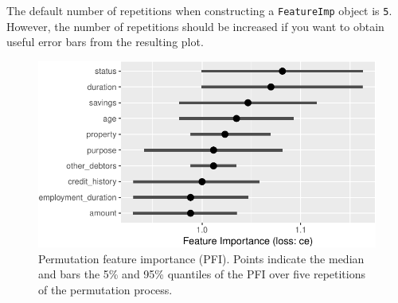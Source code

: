 \begin{tcolorbox}[enhanced jigsaw, opacitybacktitle=0.6, rightrule=.15mm, opacityback=0, arc=.35mm, breakable, titlerule=0mm, colframe=quarto-callout-tip-color-frame, coltitle=black, bottomrule=.15mm, toprule=.15mm, colback=white, colbacktitle=quarto-callout-tip-color!10!white, bottomtitle=1mm, toptitle=1mm, title=\textcolor{quarto-callout-tip-color}{\faLightbulb}\hspace{0.5em}{Increase the Number of Repetitions to Obtain Useful Error Bars}, leftrule=.75mm, left=2mm]

The default number of repetitions when constructing a
\texttt{FeatureImp} object is \texttt{5}. However, the number of
repetitions should be increased if you want to obtain useful error bars
from the resulting plot.

\end{tcolorbox}

\begin{Shaded}
\begin{Highlighting}[]
\OtherTok{=}\SpecialCharTok{$} \NormalTok{, } \NormalTok{)}
\SpecialCharTok{$}\NormalTok{()}
\end{Highlighting}
\end{Shaded}

\begin{figure}

{\centering \includegraphics[width=1\textwidth,height=\textheight]{chapters/chapter12/model_interpretation_files/figure-pdf/fig-iml-pfi-1.pdf}

}

\caption{\label{fig-iml-pfi}Permutation feature importance (PFI). Points
indicate the median and bars the 5\% and 95\% quantiles of the PFI over
five repetitions of the permutation process.}

\end{figure}

